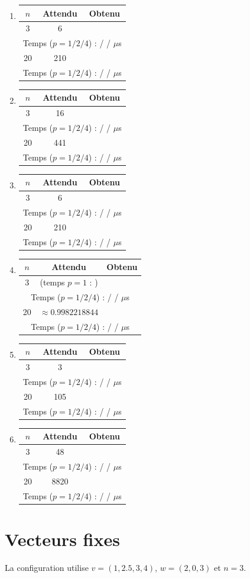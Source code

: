 \documentclass[10pt,conference]{IEEEtran}
\newcommand{\soloValue}[1]{%
  \formulaToSkelValue[label=#1,nthProcessor=1,maxDecimal=10]%
  \space(temps $p=1$ :
  \formulaToSkelTime[label=#1,nthProcessor=1,timer=microseconds,maxDecimal=3])%
}
\newcommand{\multiResultValue}[2]{%
  \formulaToSkelNthValue[label=#1,nthProcessor=1,maxSize=16,maxDecimal=10]{#2}%
}
\newcommand{\multiResultTime}[3]{%
  \formulaToSkelNthTime[label=#1,nthProcessor=#3,timer=microseconds,maxDecimal=3]{#2}%
}
\newcommand{\multiCaseTable}[5]{%
  \par\nopagebreak[4]\smallskip
  \begin{center}
  \scriptsize
  \setlength{\tabcolsep}{3pt}%
  \renewcommand{\arraystretch}{1.15}%
  \begin{tabular}{c|cc}
    $n$ & Attendu & Obtenu \\ \hline
    #2 & #3 & \multiResultValue{#1}{1} \\
    \multicolumn{3}{c}{Temps ($p=1/2/4$) :
      \multiResultTime{#1}{1}{1}/\multiResultTime{#1}{1}{2}/\multiResultTime{#1}{1}{3} $\mu$s} \\[2pt]
    #4 & #5 & \multiResultValue{#1}{2} \\
    \multicolumn{3}{c}{Temps ($p=1/2/4$) :
      \multiResultTime{#1}{2}{1}/\multiResultTime{#1}{2}{2}/\multiResultTime{#1}{2}{3} $\mu$s}
  \end{tabular}
  \end{center}%
}
\begin{document}
\begin{enumerate}
  \item {}
        \multiCaseTable{sumNatural}{3}{6}{20}{210}

  \item {}
        \multiCaseTable{sumOdd}{3}{16}{20}{441}

  \item {}
        \multiCaseTable{sumShiftedBounds}{3}{6}{20}{210}

  \item {}
        \multiCaseTable{sumTrig}{3}{\soloValue{implicitVariables}}
                                   {20}{$\approx0.9982218844$}

  \item {}
        \multiCaseTable{sumDivision}{3}{3}{20}{105}

  \item {}
        \multiCaseTable{nestedSums}{3}{48}{20}{8820}
\end{enumerate}

\section{Vecteurs fixes}
\nextSectionFormSkel

La configuration utilise $v=(1,2.5,3,4)$, $w=(2,0,3)$ et $n=3$.
\end{document}
